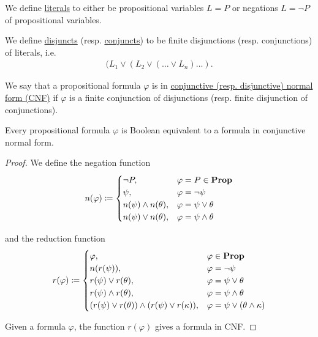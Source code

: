 \begin{definition}\label{def:conjunctive_normal_form}
  We define \uline{literals} to either be propositional variables $L = P$ or negations $L = \neg P$ of propositional variables.

  We define \uline{disjuncts} (resp. \uline{conjuncts}) to be finite disjunctions (resp. conjunctions) of literals, i.e.
  \begin{align*}
    (L_1 \lor (L_2 \lor (\ldots \lor L_n) \ldots ).
  \end{align*}

  We say that a propositional formula $\varphi$ is in \uline{conjunctive (resp. disjunctive) normal form (CNF)} if $\varphi$ is a finite conjunction of disjunctions (resp. finite disjunction of conjunctions).
\end{definition}

\begin{proposition}\label{thm:conjunctive_normal_form_reduction}
  Every propositional formula $\varphi$ is Boolean equivalent to a formula in conjunctive normal form.
\end{proposition}
\begin{proof}
  We define the negation function
  \begin{align*}
    n(\varphi) \coloneqq \begin{cases}
      \neg P,                                                   &\varphi = P \in \operatorname{\mathbf{Prop}} \\
      \psi,                                                     &\varphi = \neg \psi \\
      n(\psi) \land n(\theta),                                  &\varphi = \psi \lor \theta \\
      n(\psi) \lor n(\theta),                                   &\varphi = \psi \land \theta \\
    \end{cases}
  \end{align*}

  and the reduction function
  \begin{align*}
    r(\varphi) \coloneqq \begin{cases}
      \varphi,                                                  &\varphi \in \operatorname{\mathbf{Prop}} \\
      n(r(\psi)),                                               &\varphi = \neg \psi \\
      r(\psi) \lor r(\theta),                                   &\varphi = \psi \lor \theta \\
      r(\psi) \land r(\theta),                                  &\varphi = \psi \land \theta \\
      (r(\psi) \lor r(\theta)) \land (r(\psi) \lor r(\kappa)),  &\varphi = \psi \lor (\theta \land \kappa) \\
    \end{cases}
  \end{align*}

  Given a formula $\varphi$, the function $r(\varphi)$ gives a formula in CNF.
\end{proof}

